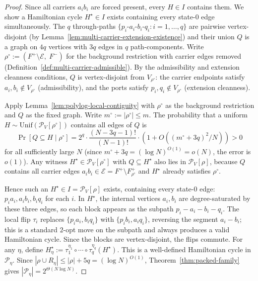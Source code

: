 \documentclass[11pt]{article}
\begin{document}
\begin{proof}
Since all carriers $a_ib_i$ are forced present, every $H \in I$ contains
them.  We show a Hamiltonian cycle $H^\star \in I$ exists containing
every state-$0$ edge simultaneously.  The $q$ through-paths
$\{p_i\text{-}a_i\text{-}b_i\text{-}q_i : i = 1,\ldots,q\}$ are
pairwise vertex-disjoint (by
Lemma~\ref{lem:multi-carrier-extension-existence}) and their union $Q$
is a graph on $4q$ vertices with $3q$ edges in $q$ path-components.
Write $\rho^\circ := (F^+ \setminus \mathcal{E},\; F^-)$ for the
background restriction with carrier edges removed
(Definition~\ref{def:multi-carrier-admissible}).  By the admissibility
and extension cleanness conditions, $Q$ is vertex-disjoint from
$V_{\rho^\circ}$: the carrier endpoints satisfy
$a_i, b_i \notin V_{\rho^\circ}$ (admissibility), and the ports satisfy
$p_i, q_i \notin V_{\rho^\circ}$ (extension cleanness).

Apply Lemma~\ref{lem:polylog-local-contiguity} with $\rho^\circ$ as
the background restriction and $Q$ as the fixed graph.  Write
$m^\circ := |\rho^\circ| \le m$.  The probability that a uniform
$H \sim \mathrm{Unif}(\mathcal{P}_V[\rho^\circ])$ contains all edges
of $Q$ is
\[
\Pr[Q \subseteq H \mid \rho^\circ]
= 2^q \cdot \frac{(N - 3q - 1)!}{(N-1)!}
  \cdot (1 + O((m^\circ+3q)^2/N))
> 0
\]
for all sufficiently large $N$ (since
$m^\circ + 3q = (\log N)^{O(1)} = o(N)$, the error is $o(1)$).
Any witness $H^\star \in \mathcal{P}_V[\rho^\circ]$ with
$Q \subseteq H^\star$ also lies in $\mathcal{P}_V[\rho]$, because $Q$
contains all carrier edges $a_ib_i \in \mathcal{E} = F^+ \setminus
F^+_{\rho^\circ}$ and $H^\star$ already satisfies $\rho^\circ$.

Hence such an $H^\star \in I = \mathcal{P}_V[\rho]$ exists, containing
every state-$0$ edge:
$p_ia_i, a_ib_i, b_iq_i$ for each $i$.  In $H^\star$, the internal vertices $a_i, b_i$
are degree-saturated by these three edges, so each block appears as the
subpath $p_i\!-\!a_i\!-\!b_i\!-\!q_i$.  The local flip $\tau_i$
replaces $\{p_ia_i, b_iq_i\}$ with $\{p_ib_i, a_iq_i\}$, reversing the
segment $a_i\!-\!b_i$; this is a standard $2$-opt move on the subpath
and always produces a valid Hamiltonian cycle.  Since the blocks are
vertex-disjoint, the flips commute.  For any $\eta$, define
$H^\star_\eta := \tau_1^{\eta_1} \circ \cdots \circ
\tau_q^{\eta_q}(H^\star)$.  This is a well-defined Hamiltonian cycle
in $\mathcal{P}_\eta$.  Since
$|\rho \cup R_\eta| \le |\rho| + 5q = (\log N)^{O(1)}$,
Theorem~\ref{thm:packed-family} gives
$|\mathcal{P}_\eta| = 2^{\Theta(N\log N)}$.
\end{proof}
\end{document}
